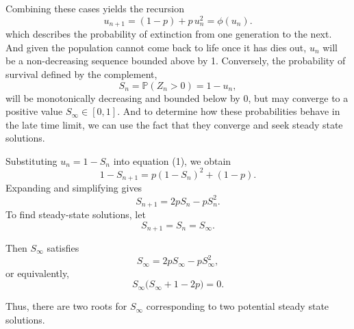 \documentclass[11pt]{article}
\begin{document}
\noindent
Combining these cases yields the recursion
\[
u_{n+1} = (1-p) + p\, u_n^2 = \phi(u_n).
\]
which describes the probability of extinction from one generation to the next. And given the population cannot come 
back to life once it has dies out, $u_n$ will be a non-decreasing sequence bounded above by 1. Conversely, the probability of survival
defined by the complement, $$ S_n = \mathbb{P}(Z_n > 0)  = 1-u_n,$$ will be monotonically decreasing and bounded below by 0, but may converge to a positive value $S_\infty \in [0,1]$.
And to determine how these probabilities behave in the late time limit, we can use the fact that they converge and seek steady state solutions.



Substituting $u_n = 1 - S_n$ into equation (1), we obtain
\[
1 - S_{n+1} = p (1 - S_n)^2 + (1 - p).
\]
Expanding and simplifying gives
\[
S_{n+1}
= 2p S_n - p S_n^2.
\]
To find steady-state solutions, let
\[
S_{n+1} = S_n = S_\infty.
\]
\begin{figure}
    \centering
    \vspace{-10pt} %
    \vspace{35pt}
\end{figure}
Then $S_\infty$ satisfies
\[
S_\infty = 2p S_\infty - p S_\infty^2,
\]
or equivalently,
\[
S_\infty \bigl( S_\infty + 1 - 2p \bigr) = 0.
\]


Thus, there are two roots for $S_\infty$ corresponding to two potential steady state solutions.
\end{document}
